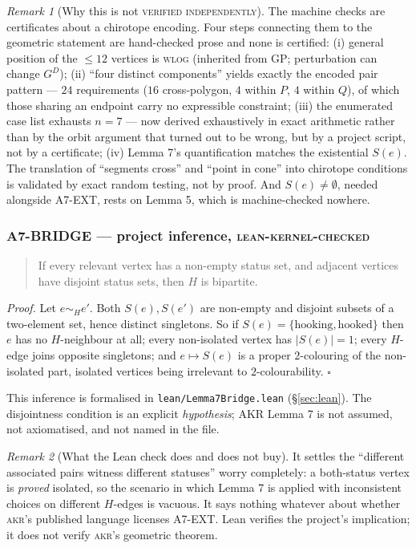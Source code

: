\documentclass[11pt,a4paper]{article}
\theoremstyle{plain}
\theoremstyle{definition}
\theoremstyle{remark}
\newtheorem*{remark}{Remark}
\newcommand{\GD}{G^{D}}
\newcommand{\stat}[1]{\footnotesize\textsc{#1}}
\begin{document}
\begin{remark}[Why this is not \stat{verified independently}]\label{rem:a7gap}
The machine checks are certificates about a chirotope encoding. Four steps
connecting them to the geometric statement are hand-checked prose and none is
certified: (i) general position of the $\le12$ vertices is \textsc{wlog}
(inherited from \textsf{GP}; perturbation can change $\GD$); (ii) ``four distinct
components'' yields exactly the encoded pair pattern --- $24$ requirements
($16$ cross-polygon, $4$ within $P$, $4$ within $Q$), of which those sharing an
endpoint carry no expressible constraint; (iii) the enumerated case list
exhausts $n=7$ --- now derived exhaustively in exact arithmetic rather than by
the orbit argument that turned out to be wrong, but by a project script, not by
a certificate; (iv) Lemma 7's quantification matches the existential $S(e)$. The translation of ``segments cross'' and ``point in cone'' into
chirotope conditions is validated by exact random testing, not by proof. And
$S(e)\neq\emptyset$, needed alongside \textsf{A7-EXT}, rests on Lemma 5, which is
machine-checked nowhere.
\end{remark}

\subsubsection*{\textsf{A7-BRIDGE} --- project inference, \stat{lean-kernel-checked}}

\begin{quote}
If every relevant vertex has a non-empty status set, and adjacent vertices have
disjoint status sets, then $H$ is bipartite.
\end{quote}

\emph{Proof.} Let $e\sim_H e'$. Both $S(e),S(e')$ are non-empty and disjoint
subsets of a two-element set, hence distinct singletons. So if
$S(e)=\{\text{hooking},\text{hooked}\}$ then $e$ has no $H$-neighbour at all; every
non-isolated vertex has $|S(e)|=1$; every $H$-edge joins opposite singletons; and
$e\mapsto S(e)$ is a proper $2$-colouring of the non-isolated part, isolated
vertices being irrelevant to $2$-colourability. $\square$

This inference is formalised in \texttt{lean/}\allowbreak\texttt{Lemma7Bridge}\allowbreak\texttt{.lean}
(\S\ref{sec:lean}). The disjointness condition is an explicit \emph{hypothesis};
AKR Lemma 7 is not assumed, not axiomatised, and not named in the file.

\begin{remark}[What the Lean check does and does not buy]
It settles the ``different associated pairs witness different statuses'' worry
completely: a both-status vertex is \emph{proved} isolated, so the scenario in
which Lemma 7 is applied with inconsistent choices on different $H$-edges is
vacuous. It says nothing whatever about whether \textsc{akr}'s published language
licenses \textsf{A7-EXT}. Lean verifies the project's implication; it does not
verify \textsc{akr}'s geometric theorem.
\end{remark}
\end{document}
